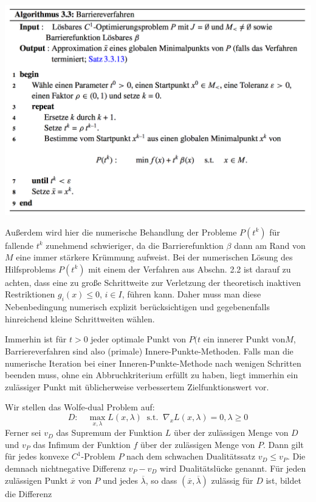 \documentclass[11pt]{scrreprt}
\theoremstyle{thmstyle}
\numberwithin{thm}{section}
\begin{document}
\begin{center}
	\includegraphics[scale=0.475]{img/a33}
\end{center}

Außerdem wird hier die numerische Behandlung der Probleme $P(t^k)$ für fallende $t^k$ zunehmend schwieriger, da die Barrierefunktion $\beta$ dann am Rand von $M$ eine immer stärkere Krümmung aufweist. Bei der numerischen Lösung des Hilfsproblems $P(t^k)$ mit einem der Verfahren aus Abschn. 2.2 ist darauf zu achten, dass eine zu große Schrittweite zur Verletzung der theoretisch inaktiven Restriktionen $g_i(x) \leq 0$, $i \in I$, führen kann. Daher muss man diese Nebenbedingung numerisch explizit berücksichtigen und gegebenenfalls hinreichend kleine Schrittweiten wählen. ~\bigskip

Immerhin ist für $t > 0$ jeder optimale Punkt von $P(t$ ein innerer Punkt von$ M$, Barriereverfahren sind also (primale) Innere-Punkte-Methoden. Falls man die numerische Iteration bei einer Inneren-Punkte-Methode nach wenigen Schritten beenden muss, ohne ein Abbruchkriterium erfüllt zu haben, liegt immerhin ein zulässiger Punkt mit üblicherweise verbessertem Zielfunktionswert vor. ~\bigskip

Wir stellen das Wolfe-dual Problem auf:
	$$ D: \quad \max_{x, \lambda} L(x, \lambda) ~\text{ s.t. }~\nabla_xL(x, \lambda) = 0, \lambda \geq 0 $$
Ferner sei $v_D$ das Supremum der Funktion $L$ über der zulässigen Menge von $D$ und $v_P$ das Infimum der Funktion $f$ über der zulässigen Menge von $P$. Dann gilt für jedes konvexe $C^1$-Problem $P$ nach dem schwachen Dualitätssatz $v_D \leq v_P$. Die demnach nichtnegative Differenz $v_P - v_D$ wird Dualitätslücke genannt.	Für jeden zulässigen Punkt $\overline{x}$ von $P$ und jedes $\overline{\lambda}$, so dass $(\overline{x}, \overline{\lambda})$ zulässig für $D$ ist, bildet die Differenz
\end{document}
